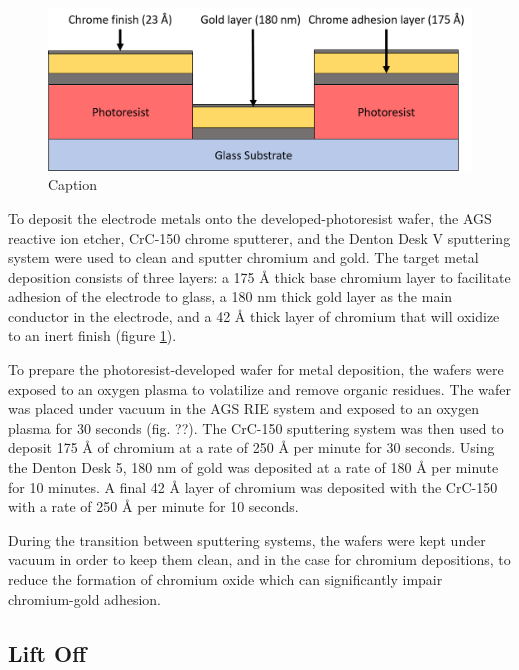 \begin{figure}[h]
    \centering
    \includegraphics[width=\textwidth]{images/metal_deposition diagram.png}
    \caption{Caption}
    \label{fig:metal_deposition}
\end{figure}
\par To deposit the electrode metals onto the developed-photoresist wafer, the AGS reactive ion etcher, CrC-150 chrome sputterer, and the Denton Desk V sputtering system were used to clean and sputter chromium and gold. The target metal deposition consists of three layers: a 175 \si{\angstrom} thick base chromium layer to facilitate adhesion of the electrode to glass, a 180 nm thick gold layer as the main conductor in the electrode, and a 42 \si{\angstrom} thick layer of chromium that will oxidize to an inert finish (figure \ref{fig:metal_deposition}).

\par To prepare the photoresist-developed wafer for metal deposition, the wafers were exposed to an oxygen plasma to volatilize and remove organic residues. The wafer was placed under vacuum in the AGS RIE system and exposed to an oxygen plasma for 30 seconds (fig. ??). The CrC-150 sputtering system was then used to deposit 175 \si{\angstrom} of chromium at a rate of 250 \si{\angstrom} per minute for 30 seconds. Using the Denton Desk 5, 180 nm of gold was deposited at a rate of 180 \si{\angstrom} per minute for 10 minutes. A final 42 \si{\angstrom} layer of chromium was deposited with the CrC-150 with a rate of 250 \si{\angstrom} per minute for 10 seconds. 

\par During the transition between sputtering systems, the wafers were kept under vacuum in order to keep them clean, and in the case for chromium depositions, to reduce the formation of chromium oxide which can significantly impair chromium-gold adhesion.

\subsection*{Lift Off}

